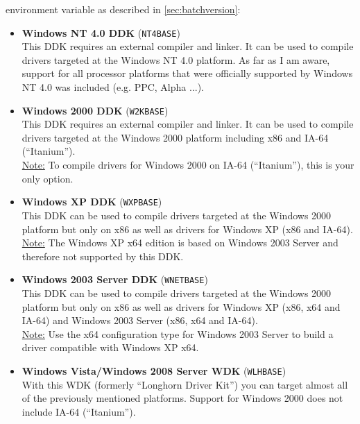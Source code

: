 \documentclass[a4paper,titlepage]{report}
\begin{document}
\begin{itemize}
        environment variable as described in \autoref{sec:batchversion}:
        \begin{itemize}
          \item
            \textbf{Windows NT 4.0 DDK} (\texttt{NT4BASE})\\
            This DDK requires an external compiler and linker. It can be used to compile
            drivers targeted at the Windows NT 4.0 platform. As far as I am aware,
            support for all processor platforms that were officially supported by
            Windows NT 4.0 was included (e.g. PPC, Alpha ...).
          \item
            \textbf{Windows 2000 DDK} (\texttt{W2KBASE})\\
            This DDK requires an external compiler and linker. It can be used to compile
            drivers targeted at the Windows 2000 platform including x86 and IA-64 (``Itanium'').\\
            \underline{Note:} To compile drivers for Windows 2000 on IA-64 (``Itanium''),
            this is your only option.
          \item
            \textbf{Windows XP DDK} (\texttt{WXPBASE})\\
            This DDK can be used to compile drivers targeted at the Windows 2000 platform
            but only on x86 as well as drivers for Windows XP (x86 and IA-64).\\
            \underline{Note:} The Windows XP x64 edition is based on Windows 2003 Server
            and therefore not supported by this DDK.
          \item
            \textbf{Windows 2003 Server DDK} (\texttt{WNETBASE})\\
            This DDK can be used to compile drivers targeted at the Windows 2000 platform
            but only on x86 as well as drivers for Windows XP (x86, x64 and IA-64)
            and Windows 2003 Server (x86, x64 and IA-64).\\
            \underline{Note:} Use the x64 configuration type for Windows 2003 Server to
            build a driver compatible with Windows XP x64.
          \item
            \textbf{Windows Vista/Windows 2008 Server WDK} (\texttt{WLHBASE})\\
            With this WDK (formerly ``Longhorn Driver Kit'')
            you can target almost all of the previously mentioned platforms. Support for
            Windows 2000 does not include IA-64 (``Itanium'').\\

\end{itemize}
\end{itemize}
\end{document}
